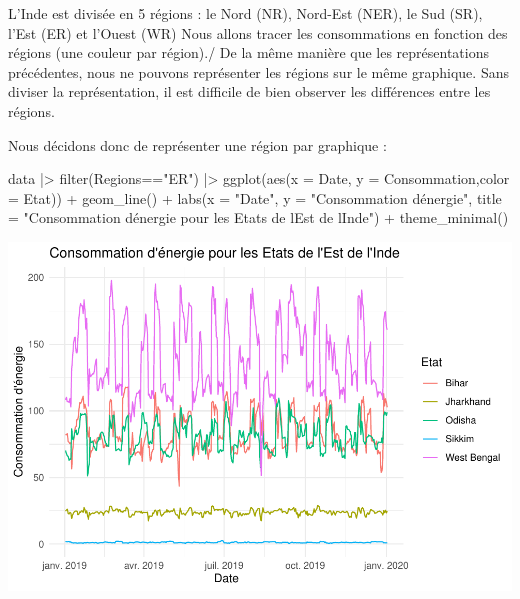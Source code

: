 \documentclass[
]{article}
\newenvironment{Shaded}{\begin{snugshade}}{\end{snugshade}}
\newcommand{\AttributeTok}[1]{\textcolor[rgb]{0.77,0.63,0.00}{#1}}
\newcommand{\FunctionTok}[1]{\textcolor[rgb]{0.00,0.00,0.00}{#1}}
\newcommand{\NormalTok}[1]{#1}
\newcommand{\SpecialCharTok}[1]{\textcolor[rgb]{0.00,0.00,0.00}{#1}}
\newcommand{\StringTok}[1]{\textcolor[rgb]{0.31,0.60,0.02}{#1}}
\begin{document}
L'Inde est divisée en 5 régions : le Nord (NR), Nord-Est (NER), le Sud
(SR), l'Est (ER) et l'Ouest (WR) Nous allons tracer les consommations en
fonction des régions (une couleur par région)./ De la même manière que
les représentations précédentes, nous ne pouvons représenter les régions
sur le même graphique. Sans diviser la représentation, il est difficile
de bien observer les différences entre les régions.

Nous décidons donc de représenter une région par graphique :

\begin{Shaded}
\begin{Highlighting}[]
\NormalTok{data }\SpecialCharTok{|\textgreater{}} 
  \FunctionTok{filter}\NormalTok{(Regions}\SpecialCharTok{==}\StringTok{"ER"}\NormalTok{) }\SpecialCharTok{|\textgreater{}} 
  \FunctionTok{ggplot}\NormalTok{(}\FunctionTok{aes}\NormalTok{(}\AttributeTok{x =}\NormalTok{ Date, }\AttributeTok{y =}\NormalTok{ Consommation,}\AttributeTok{color =}\NormalTok{ Etat)) }\SpecialCharTok{+}
  \FunctionTok{geom\_line}\NormalTok{() }\SpecialCharTok{+}
  \FunctionTok{labs}\NormalTok{(}\AttributeTok{x =} \StringTok{"Date"}\NormalTok{, }\AttributeTok{y =} \StringTok{"Consommation d\textquotesingle{}énergie"}\NormalTok{,}
       \AttributeTok{title =} \StringTok{"Consommation d\textquotesingle{}énergie pour les Etats de l\textquotesingle{}Est de l\textquotesingle{}Inde"}\NormalTok{) }\SpecialCharTok{+}
  \FunctionTok{theme\_minimal}\NormalTok{()}
\end{Highlighting}
\end{Shaded}

\includegraphics{Projet_CHESNAIS_GUIBERT_files/figure-latex/unnamed-chunk-17-1.pdf}
\end{document}
